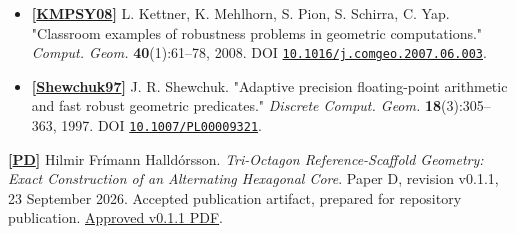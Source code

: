 \documentclass[
  11pt,
  a4paper,
]{article}
\newcommand{\paperdoi}[1]{\begingroup\urlstyle{same}\href{https://doi.org/#1}{\nolinkurl{#1}}\endgroup}
\begin{document}
\begin{itemize}
  \hypertarget{ref-Yap97}{}\textbf{{[}\hyperlink{ref-Yap97}{Yap97}{]}} C. K. Yap. "Towards exact geometric computation." \emph{Comput. Geom.} \textbf{7}(1--2):3--23, 1997. DOI \paperdoi{10.1016/0925-7721(95)00040-2}.
\item
  \hypertarget{ref-KMPSY08}{}\textbf{{[}\hyperlink{ref-KMPSY08}{KMPSY08}{]}} L. Kettner, K. Mehlhorn, S. Pion, S. Schirra, C. Yap. "Classroom examples of robustness problems in geometric computations." \emph{Comput. Geom.} \textbf{40}(1):61--78, 2008. DOI \paperdoi{10.1016/j.comgeo.2007.06.003}.
\item
  \hypertarget{ref-Shewchuk97}{}\textbf{{[}\hyperlink{ref-Shewchuk97}{Shewchuk97}{]}} J. R. Shewchuk. "Adaptive precision floating-point arithmetic and fast robust geometric predicates." \emph{Discrete Comput. Geom.} \textbf{18}(3):305--363, 1997. DOI \paperdoi{10.1007/PL00009321}.
\end{itemize}

\hypertarget{ref-PD}{}\textbf{{[}\hyperlink{ref-PD}{PD}{]}} Hilmir Frímann Halldórsson. \emph{Tri-Octagon Reference-Scaffold Geometry: Exact Construction of an Alternating Hexagonal Core}. Paper D, revision v0.1.1, 23 September 2026. Accepted publication artifact, prepared for repository publication. \href{../../../PAPER_D/v0.1.1/publication/PAPER_D_REFERENCE_SCAFFOLD_v0.1.1.pdf}{Approved v0.1.1 PDF}.

\endgroup
\end{document}
